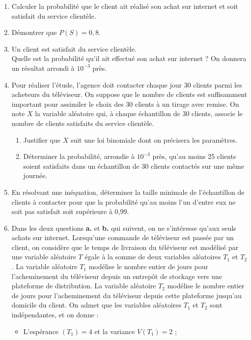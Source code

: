 \documentclass[11pt,fleqn, openany]{book} %
\begin{document}
\begin{exercise}[subtitle={(Métropole 2024, Jour 1)}]
\begin{enumerate}
\item Calculer la probabilité que le client ait réalisé son achat sur internet et soit satisfait
du service clientèle.
\vskip5pt
\item Démontrer que $P(S) = 0,8$.
\vskip5pt
\item Un client est satisfait du service clientèle.\\ Quelle est la probabilité qu'il ait effectué son achat sur internet ? On donnera un résultat arrondi à $10^{-3}$ près.
\vskip5pt
\item Pour réaliser l'étude, l'agence doit contacter chaque jour 30 clients parmi les acheteurs du téléviseur. On suppose que le nombre de clients est suffisamment important
pour assimiler le choix des 30 clients à un tirage avec remise. On note $X$ la variable aléatoire qui, à chaque échantillon de 30 clients, associe le nombre de clients satisfaits du service clientèle.
\begin{enumerate}
\item Justifier que $X$ suit une loi binomiale dont on précisera les paramètres.
\item Déterminer la probabilité, arrondie à $10^{-3}$ près, qu'au moins 25 clients soient satisfaits dans un échantillon de 30 clients contactés sur une même journée.\end{enumerate}
\vskip5pt
\item En résolvant une inéquation, déterminer la taille minimale de l'échantillon de clients à contacter pour que la probabilité qu'au moins l'un d'entre eux ne soit pas satisfait soit supérieure à 0,99.
\vskip5pt
\item Dans les deux questions \textbf{a.} et \textbf{b.} qui suivent, on ne s'intéresse qu'aux seuls achats sur
internet.
\vskip5pt
Lorsqu'une commande de téléviseur est passée par un client, on considère que le
temps de livraison du téléviseur est modélisé par une variable aléatoire $T$ égale à la
somme de deux variables aléatoires $T_1$ et $T_2$.
\vskip5pt
La variable aléatoire $T_1$ modélise le nombre entier de jours pour l'acheminement du téléviseur depuis un entrepôt de stockage vers une plateforme de distribution. La
variable aléatoire $T_2$ modélise le nombre entier de jours pour l'acheminement du téléviseur depuis cette plateforme jusqu'au domicile du client.
\vskip5pt
On admet que les variables aléatoires $T_1$ et $T_2$ sont indépendantes, et on donne :
\begin{itemize}
\item L'espérance $ (T_1) = 4$ et la variance $V (T_1) = 2$ ;

\end{itemize}
\end{enumerate}
\end{exercise}
\end{document}
